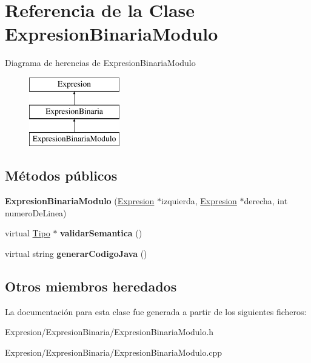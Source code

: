 \hypertarget{class_expresion_binaria_modulo}{\section{Referencia de la Clase Expresion\-Binaria\-Modulo}
\label{class_expresion_binaria_modulo}
}
Diagrama de herencias de Expresion\-Binaria\-Modulo\begin{figure}[H]
\begin{center}
\leavevmode
\includegraphics[height=3.000000cm]{class_expresion_binaria_modulo}
\end{center}
\end{figure}
\subsection*{Métodos públicos}
\begin{DoxyCompactItemize}
\item 
\hypertarget{class_expresion_binaria_modulo_a47dc7e956cf3e55393f0e8917ba11519}{{\bfseries Expresion\-Binaria\-Modulo} (\hyperlink{class_expresion}{Expresion} $\ast$izquierda, \hyperlink{class_expresion}{Expresion} $\ast$derecha, int numero\-De\-Linea)}\label{class_expresion_binaria_modulo_a47dc7e956cf3e55393f0e8917ba11519}

\item 
\hypertarget{class_expresion_binaria_modulo_acf7adb662d0193041e1d2f0c366070e4}{virtual \hyperlink{class_tipo}{Tipo} $\ast$ {\bfseries validar\-Semantica} ()}\label{class_expresion_binaria_modulo_acf7adb662d0193041e1d2f0c366070e4}

\item 
\hypertarget{class_expresion_binaria_modulo_ab28c33ff63bf04104c6e8208e2f624f9}{virtual string {\bfseries generar\-Codigo\-Java} ()}\label{class_expresion_binaria_modulo_ab28c33ff63bf04104c6e8208e2f624f9}

\end{DoxyCompactItemize}
\subsection*{Otros miembros heredados}


La documentación para esta clase fue generada a partir de los siguientes ficheros\-:\begin{DoxyCompactItemize}
\item 
Expresion/\-Expresion\-Binaria/Expresion\-Binaria\-Modulo.\-h\item 
Expresion/\-Expresion\-Binaria/Expresion\-Binaria\-Modulo.\-cpp\end{DoxyCompactItemize}
